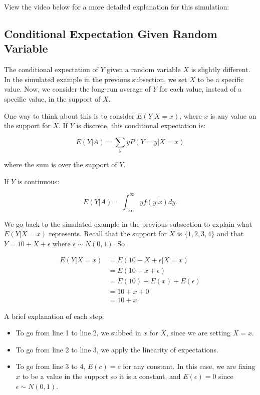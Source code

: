 \documentclass[
]{book}
\providecommand{\tightlist}{%
  \setlength{\itemsep}{0pt}\setlength{\parskip}{0pt}}
\begin{document}
View the video below for a more detailed explanation for this simulation:

\hypertarget{conditional-expectation-given-random-variable}{%
\subsection{Conditional Expectation Given Random Variable}\label{conditional-expectation-given-random-variable}}

The conditional expectation of \(Y\) given a random variable \(X\) is slightly different. In the simulated example in the previous subsection, we set \(X\) to be a specific value. Now, we consider the long-run average of \(Y\) for each value, instead of a specific value, in the support of \(X\).

One way to think about this is to consider \(E(Y|X=x)\), where \(x\) is any value on the support for \(X\). If \(Y\) is discrete, this conditional expectation is:

\begin{equation} 
E(Y|A) = \sum_y y P(Y=y|X=x) 
\label{eq:5-condexpdis2}
\end{equation}

where the sum is over the support of \(Y\).

If \(Y\) is continuous:

\begin{equation} 
E(Y|A) = \int_{-\infty}^{\infty} y f(y|x) dy.
\label{eq:5-condexpcont2}
\end{equation}

We go back to the simulated example in the previous subsection to explain what \(E(Y|X=x)\) represents. Recall that the support for \(X\) is \(\{1,2,3,4\}\) and that \(Y = 10 + X + \epsilon\) where \(\epsilon \sim N(0,1)\). So

\[
\begin{split}
E(Y|X=x) &= E(10 + X + \epsilon | X=x)\\
 &= E(10 + x + \epsilon) \\
 &= E(10) + E(x) + E(\epsilon) \\
&= 10 + x + 0 \\
 &= 10 + x.
\end{split}
\]

A brief explanation of each step:

\begin{itemize}
\tightlist
\item
  To go from line 1 to line 2, we subbed in \(x\) for \(X\), since we are setting \(X=x\).
\item
  To go from line 2 to line 3, we apply the linearity of expectations.
\item
  To go from line 3 to 4, \(E(c)=c\) for any constant. In this case, we are fixing \(x\) to be a value in the support so it is a constant, and \(E(\epsilon) = 0\) since \(\epsilon \sim N(0,1)\).
\end{itemize}
\end{document}

